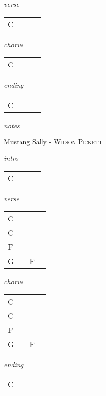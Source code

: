 \documentclass[12pt]{article}
\begin{document}
\textit{verse}

\begin{tabular}{|P{1.25in}|P{1.25in}|P{1.25in}|P{1.25in}|}
  C &   &   &   \\
\end{tabular}

\textit{chorus}

\begin{tabular}{|P{1.25in}|P{1.25in}|P{1.25in}|P{1.25in}|}
  C &   &   &   \\
\end{tabular}

\textit{ending}

\begin{tabular}{|P{1.25in}|P{1.25in}|P{1.25in}|P{1.25in}|}
  C &   &   &   \\
\end{tabular}

\textit{notes}

\newpage

{\Huge Mustang Sally} {\huge - \textsc{Wilson Pickett}}

\huge
\textit{intro}

\begin{tabular}{|P{1.25in}|P{1.25in}|P{1.25in}|P{1.25in}|}
  C &   &   &   \\

\end{tabular}

\textit{verse}

\begin{tabular}{|P{1.25in}|P{1.25in}|P{1.25in}|P{1.25in}|}
  C &   &   &   \\
  C &   &   &   \\
  F &   &   &   \\
  G &   & F  &   \\
\end{tabular}

\textit{chorus}

\begin{tabular}{|P{1.25in}|P{1.25in}|P{1.25in}|P{1.25in}|}
  C &   &   &   \\
  C &   &   &   \\
  F &   &   &   \\
  G &   & F  &   \\
\end{tabular}

\textit{ending}

\begin{tabular}{|P{1.25in}|P{1.25in}|P{1.25in}|P{1.25in}|}
  C &   &   &   \\
\end{tabular}
\end{document}
